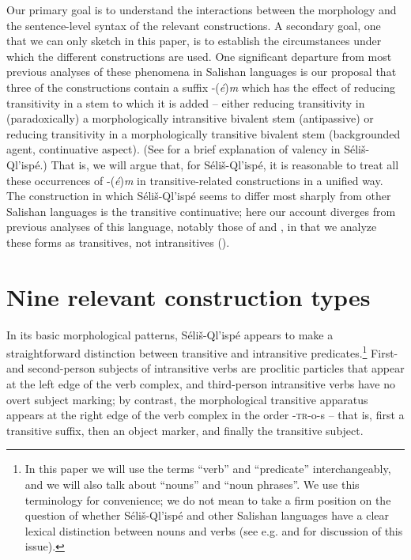 \documentclass[output=paper,colorlinks,citecolor=brown]{langscibook}
\begin{document}
  Our primary goal is to understand the interactions between the
  morphology and the sentence-level syntax of the relevant
  constructions.  A secondary goal, one that we can only sketch in
  this paper, is to establish the circumstances under which the
  different constructions are used.  One significant departure from
  most previous analyses of these phenomena in Salishan languages is
  our proposal that three of the constructions contain a suffix
  -(\emph{\'e})\emph{m} which has the effect of reducing transitivity
  in a stem to which it is added -- either reducing transitivity in
  (paradoxically) a morphologically intransitive bivalent stem
  (antipassive) or reducing transitivity in a morphologically
  transitive bivalent stem (backgrounded agent, continuative aspect).
  (See  for a brief explanation of valency in
  S\'eli\v{s}-Ql'isp\'e.) That is, we will argue that, for
  S\'eli\v{s}-Ql'isp\'e, it is reasonable to treat all these
  occurrences of -(\emph{\'e})\emph{m} in transitive-related
  constructions in a unified way.  The construction in which
  S\'eli\v{s}-Ql'isp\'e seems to differ most sharply from other
  Salishan languages is the transitive continuative; here our account
  diverges from previous analyses of this language, notably those of
  \citet{Kroeber:1999} and \citet{Vogt:1940}, in
  that we analyze these
  forms as transitives, not intransitives ().

\section{Nine relevant construction types}
\label{thomason_section_2}
In its basic morphological patterns, S\'eli\v{s}-Ql'isp\'e appears to
make a straightforward distinction between transitive and intransitive
predicates.\footnote{In this paper we will use the terms “verb” and
“predicate” interchangeably, and we will also talk about “nouns” and
“noun phrases”.  We use this terminology for convenience; we do not
mean to take a firm position on the question of whether
S\'eli\v{s}-Ql'isp\'e and other Salishan languages have a clear
lexical distinction between nouns and verbs (see e.g. \citealt{Kinkade:1983} and
\citealt{vanEijk&Hess:1986} for discussion of this issue).}  First- and
second\hyp person subjects of intransitive verbs are proclitic particles
that appear at the left edge of the verb complex, and third-person
intransitive verbs have no overt subject marking; by contrast, the
morphological transitive apparatus appears at the right edge of the
verb complex in the order -\textsc{tr}-o-s -- that is, first a
transitive suffix, then an object marker, and finally the transitive
subject.
\end{document}

